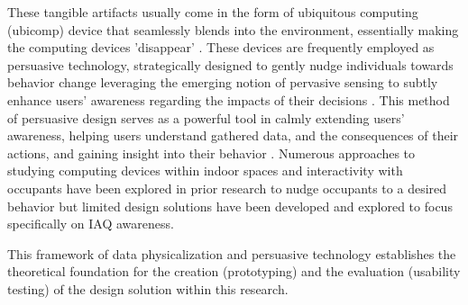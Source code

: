These tangible artifacts usually come in the form of ubiquitous computing (ubicomp) \cite{bell_yesterdays_2007} device that seamlessly blends into the environment, essentially making the computing devices 'disappear' \cite{weiser_computer_1999}. These devices are frequently employed as persuasive technology, strategically designed to gently nudge individuals towards behavior change leveraging the emerging notion of pervasive sensing to subtly enhance users' awareness regarding the impacts of their decisions \cite{bader_windowwall_2019, rogers_ambient_2010}. This method of persuasive design serves as a powerful tool in calmly extending users' awareness, helping users understand gathered data, and the consequences of their actions, and gaining insight into their behavior \cite{bae_making_2022}. Numerous approaches to studying computing devices within indoor spaces and interactivity with occupants have been explored in prior research \cite{sauve_physecology_2022} to nudge occupants to a desired behavior but limited design solutions have been developed and explored to focus specifically on IAQ awareness. 

This framework of data physicalization and persuasive technology establishes the theoretical foundation for the creation (prototyping) and the evaluation (usability testing) of the design solution within this research.